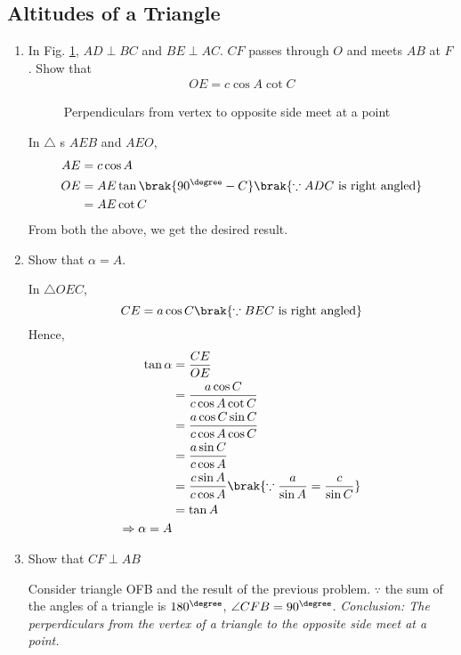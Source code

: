 \subsection{Altitudes of a Triangle}
\renewcommand{\theequation}{\theenumi}
\begin{enumerate}[label=\arabic*.,ref=\thesubsection.\theenumi]
\item
	In Fig. \ref{ch3_perp_triang}, $AD \perp BC$ and $BE \perp AC$. $CF$ passes through $O$ and meets
	$AB$ at $F$.  	
	Show that 
	\begin{align}
	OE = c \cos A \cot C
	\end{align}

	\begin{figure}[!ht]
		\begin{center}
			
			\resizebox{\columnwidth}{!}{}
		\end{center}
		\caption{Perpendiculars from vertex to opposite side meet at a point}
		\label{ch3_perp_triang}	
	\end{figure}
%
\solution In $\triangle$ s $AEB$ and $AEO$,
%
\begin{align}
AE &= c \cos A \\
OE &= AE \tan \brak{90^{\degree} - C} \brak{\because ADC \text{ is right angled}} \\
&= AE \cot C
\end{align}
%
From both the above, we get the desired result.
%
\item
	Show that $\alpha = A$.

\solution In $\triangle OEC$,
%
\begin{equation}
CE = a \cos C \brak{\because BEC \text{ is right angled}}
\end{equation}
%
Hence,
%
\begin{equation}
\begin{split}
\tan \alpha &= \frac{CE}{OE} \\
&=  \frac{a \cos C}{c \cos A \cot C} \\
&=  \frac{a \cos C \sin C}{c \cos A \cos C} \\
&= \frac{a \sin C}{c \cos A } \\
&= \frac{c \sin A}{c \cos A } \brak{\because \frac{a}{\sin A} = \frac{c}{\sin C}}\\
&= \tan A\\
\Rightarrow \alpha = A
\end{split}
\end{equation}
%
\item
	Show that $CF \perp AB$

\solution Consider triangle OFB and the result of the previous problem.  $\because$ the sum of the angles of a triangle is $180^{\degree}$, $\angle CFB = 90^{\degree}$.
{\em Conclusion: The perperdiculars from the vertex of a triangle to the opposite side meet at a point.}
\end{enumerate}
